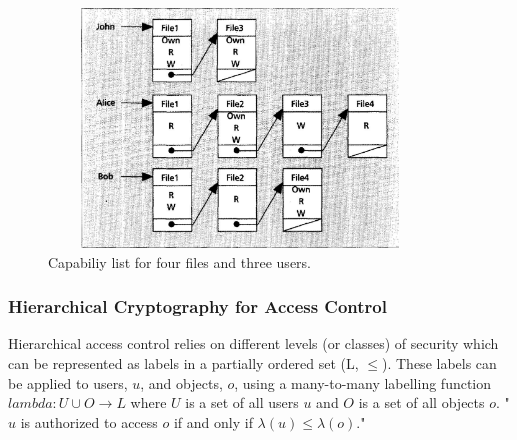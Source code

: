 \documentclass[12pt, titlepage]{article}
\begin{document}
\begin{figure}
\centerline{\includegraphics[height=2.5in,width=4in,angle=0]{capabilities.pdf}}
\caption{Capabiliy list for four files and three users.\cite{accessControlPrinciples}}
\label{fig:capabilities}
\end{figure}

\subsubsection{Hierarchical Cryptography for Access Control}
Hierarchical access control relies on different levels (or classes) of security which can be represented as labels in a partially ordered set (L, $≤$). These labels can be applied to users, $u$, and objects, $o$, using a many-to-many labelling function $lambda : U ∪ O → L$ where $U$ is a set of all users $u$ and $O$ is a set of all objects $o$. "$u$ is authorized to access $o$ if and only if $\lambda(u)≤\lambda(o)$\cite{mainPaper}."
\end{document}
